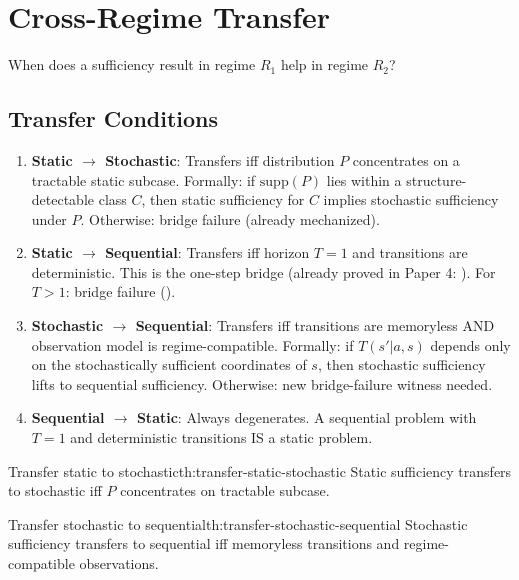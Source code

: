 \section{Cross-Regime Transfer}\label{sec:cross-regime-transfer}

When does a sufficiency result in regime $R_1$ help in regime $R_2$?

\subsection{Transfer Conditions}

\begin{enumerate}
\item \textbf{Static $\to$ Stochastic}: Transfers iff distribution $P$ concentrates on a tractable static subcase. Formally: if $\text{supp}(P)$ lies within a structure-detectable class $C$, then static sufficiency for $C$ implies stochastic sufficiency under $P$. Otherwise: bridge failure (already mechanized).

\item \textbf{Static $\to$ Sequential}: Transfers iff horizon $T = 1$ and transitions are deterministic. This is the one-step bridge (already proved in Paper 4: ). For $T > 1$: bridge failure ().

\item \textbf{Stochastic $\to$ Sequential}: Transfers iff transitions are memoryless AND observation model is regime-compatible. Formally: if $T(s'|a,s)$ depends only on the stochastically sufficient coordinates of $s$, then stochastic sufficiency lifts to sequential sufficiency. Otherwise: new bridge-failure witness needed.

\item \textbf{Sequential $\to$ Static}: Always degenerates. A sequential problem with $T=1$ and deterministic transitions IS a static problem.
\end{enumerate}

\begin{claim}{Transfer static to stochastic}{th:transfer-static-stochastic}
Static sufficiency transfers to stochastic iff $P$ concentrates on tractable subcase.
\end{claim}


\begin{claim}{Transfer stochastic to sequential}{th:transfer-stochastic-sequential}
Stochastic sufficiency transfers to sequential iff memoryless transitions and regime-compatible observations.
\end{claim}

